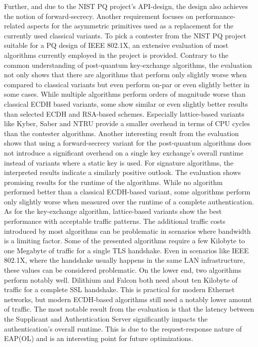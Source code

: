 Further, and due to the \ac{NIST} \ac{PQ} project's API-design, the design also achieves the notion of forward-secrecy. Another requirement focuses on performance-related aspects for the asymmetric primitives used as a replacement for the currently used classical variants. To pick a contester from the NIST PQ project suitable for a PQ design of IEEE 802.1X, an extensive evaluation of most algorithms currently employed in the project is provided. Contrary to the common understanding of post-quantum key-exchange algorithms, the evaluation not only shows that there are algorithms that perform only slightly worse when compared to classical variants but even perform on-par or even slightly better in some cases. While multiple algorithms perform orders of magnitude worse than classical \ac{ECDH} based variants, some show similar or even slightly better results than selected \ac{ECDH} and RSA-based schemes. Especially lattice-based variants like Kyber, Saber and NTRU provide a smaller overhead in terms of CPU cycles than the contester algorithms. Another interesting result from the evaluation shows that using a forward-secrecy variant for the post-quantum algorithms does not introduce a significant overhead on a single key exchange's overall runtime instead of variants where a static key is used. For signature algorithms, the interpreted results indicate a similarly positive outlook. The evaluation shows promising results for the runtime of the algorithms. While no algorithm performed better than a classical \ac{ECDH}-based variant, some algorithms perform only slightly worse when measured over the runtime of a complete authentication. As for the key-exchange algorithm, lattice-based variants show the best performance with acceptable traffic patterns. The additional traffic costs introduced by most algorithms can be problematic in scenarios where bandwidth is a limiting factor. Some of the presented algorithms require a few Kilobyte to one Megabyte of traffic for a single TLS handshake. Even in scenarios like IEEE 802.1X, where the handshake usually happens in the same \ac{LAN} infrastructure, these values can be considered problematic. On the lower end, two algorithms perform notably well. Dilithium and Falcon both need about ten Kilobyte of traffic for a complete SSL handshake. This is practical for modern Ethernet networks, but modern \acs{ECDH}-based algorithms still need a notably lower amount of traffic. The most notable result from the evaluation is that the latency between the Supplicant and Authentication Server significantly impacts the authentication's overall runtime. This is due to the request-response nature of EAP(OL) and is an interesting point for future optimizations.

